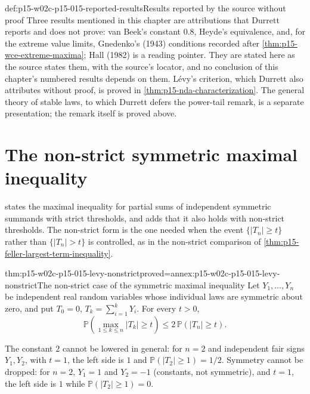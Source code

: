 \begin{proofboundary}{def:p15-w02c-p15-015-reported-results}{Results reported by the source without proof}
Three results mentioned in this chapter are attributions that Durrett
reports and does not prove: van Beek's constant \(0.8\), Heyde's
equivalence, and, for the extreme value limits, Gnedenko's (1943)
conditions recorded after \cref{thm:p15-wce-extreme-maxima}; Hall (1982)
is a reading pointer. They are stated here as the source states them, with the source's
locator, and no conclusion of this chapter's numbered results depends on
them. L\'evy's criterion, which Durrett also attributes without proof,
is proved in \cref{thm:p15-nda-characterization}. The general theory
of stable laws, to which Durrett defers the power-tail remark, is a
separate presentation; the remark itself is proved above.
\end{proofboundary}

\section{The non-strict symmetric maximal inequality}
\label{sec:p15-w02c-p15-015-levy-nonstrict}

 states the maximal inequality for
partial sums of independent symmetric summands with strict thresholds,
and adds that it also holds with non-strict thresholds. The non-strict
form is the one needed when the event \(\{|T_n|\geq t\}\) rather than
\(\{|T_n|>t\}\) is controlled, as in the non-strict comparison of
\cref{thm:p15-feller-largest-term-inequality}.

\begin{hblemma}{thm:p15-w02c-p15-015-levy-nonstrict}{proved=annex:p15-w02c-p15-015-levy-nonstrict}{The non-strict case of the symmetric maximal inequality}
Let \(Y_1,\ldots,Y_n\) be independent real random variables whose
individual laws are symmetric about zero, and put \(T_0=0\),
\(T_k=\sum_{i=1}^kY_i\). For every \(t>0\),
\[
 \mathbb P\!\left(\max_{1\leq k\leq n}|T_k|\geq t\right)
          \leq2\,\mathbb P(|T_n|\geq t).
\]
\end{hblemma}

The constant \(2\) cannot be lowered in general: for \(n=2\) and
independent fair signs \(Y_1,Y_2\), with \(t=1\), the left side is
\(1\) and \(\mathbb P(|T_2|\geq1)=1/2\). Symmetry cannot be dropped: for
\(n=2\), \(Y_1=1\) and \(Y_2=-1\) (constants, not symmetric), and
\(t=1\), the left side is \(1\) while \(\mathbb P(|T_2|\geq1)=0\).

